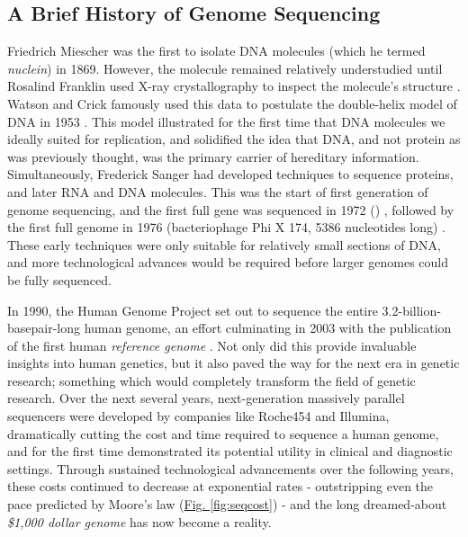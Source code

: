 \subsection{A Brief History of Genome Sequencing}
Friedrich Miescher was the first to isolate DNA molecules (which he termed \emph{nuclein}) in 1869. However, the molecule remained relatively understudied until Rosalind Franklin used X-ray crystallography to inspect the molecule's structure \cite{elkin2003rosalind}. Watson and Crick famously used this data to postulate the double-helix model of DNA in 1953 \cite{watson1953molecular}. This model illustrated for the first time that DNA molecules we ideally suited for replication, and solidified the idea that DNA, and not protein as was previously thought, was the primary carrier of hereditary information. Simultaneously, Frederick Sanger had developed techniques to sequence proteins, and later RNA and DNA molecules. This was the start of first generation of genome sequencing, and the first full gene was sequenced in 1972 () \cite{TODO}, followed by the first full genome in 1976 (bacteriophage Phi X 174, 5386 nucleotides long) \cite{}. These early techniques were only suitable for relatively small sections of DNA, and more technological advances would be required before larger genomes could be fully sequenced.

In 1990, the Human Genome Project \cite{olson1993human} set out to sequence the entire 3.2-billion-basepair-long human genome, an effort culminating in 2003 with the publication of the first human \textit{reference genome} \cite{international2004finishing}. Not only did this provide invaluable insights into human genetics, but it also paved the way for the next era in genetic research; something which would completely transform the field of genetic research. Over the next several years, next-generation massively parallel sequencers were developed by companies like Roche454 and Illumina, dramatically cutting the cost and time required to sequence a human genome, and for the first time demonstrated its potential utility in clinical and diagnostic settings. Through sustained technological advancements over the following years, these costs continued to decrease at exponential rates - outstripping even the pace predicted by Moore's law (\hyperref[fig:seqcost]{Fig. \ref{fig:seqcost}}) - and the long dreamed-about \textit{\$1,000 dollar genome} \cite{thousanddollargenome} \cite{sequencingcostsNHGRI} has now become a reality.

